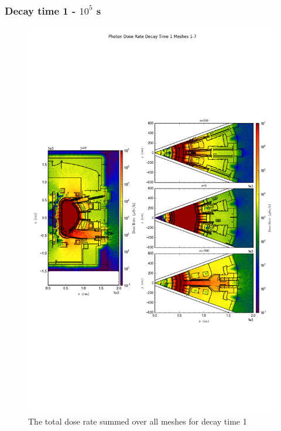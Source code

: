 \documentclass[12pt]{article}
\begin{document}
\subsubsection{Decay time 1 - $10^5$ s}
\begin{figure}[ht!]
\centering
\includegraphics[trim={0cm 9cm 0cm 10cm},clip,scale=0.75]{../plots/final_model_with_b4c/Photon_Dose_Rate_Decay_Time_1_Meshes_1-7.png}
\caption{The total dose rate summed over all meshes for decay time 1}
\label{fig:photons_dc1_b4c_total}
\end{figure}
\end{document}
